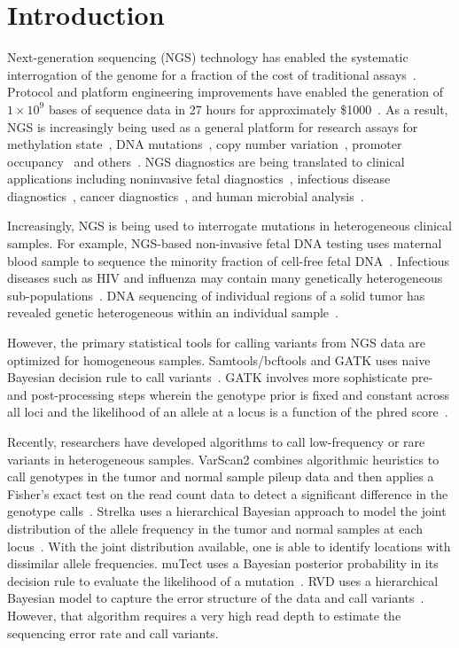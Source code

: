 \documentclass{bioinfo}
\begin{document}
\section{Introduction}

Next-generation sequencing (NGS) technology has enabled the systematic interrogation of the genome for a fraction of the cost of traditional assays~\citep{Koboldt:2013kw}. Protocol and platform engineering improvements have enabled the generation of $1\times10^9$ bases of sequence data in 27 hours for approximately \$1000~\citep{Quail:2012hf}. As a result, NGS is increasingly being used as a general platform for research assays for methylation state~\citep{Laird:2010ab}, DNA mutations~\citep{Consortium:2013co}, copy number variation~\citep{Alkan:2009cr}, promoter occupancy~\citep{Ouyang:2009hc} and others~\citep{Rivera:2013ee}. NGS diagnostics are being translated to clinical applications including noninvasive fetal diagnostics~\citep{Kitzman:2012hea}, infectious disease diagnostics~\citep{Capobianchi:2012em}, cancer diagnostics~\citep{Navin:2010gu}, and human microbial analysis~\citep{Consortium:2013iz}.

Increasingly, NGS is being used to interrogate mutations in heterogeneous clinical samples. For example, NGS-based non-invasive fetal DNA testing uses maternal blood sample to sequence the minority fraction of cell-free fetal DNA~\citep{Fan:2008di}. Infectious diseases such as HIV and influenza may contain many genetically heterogeneous sub-populations~\citep{Flaherty:2011ja, Ghedin:2010ie}. DNA sequencing of individual regions of a solid tumor has revealed genetic heterogeneous within an individual sample~\citep{Navin:2010gu}.

However, the primary statistical tools for calling variants from NGS data are optimized for homogeneous samples.  Samtools/bcftools and GATK uses naive Bayesian decision rule to call variants~\citep{li2011statistical, depristo2011framework}. GATK involves more sophisticate pre- and post-processing steps wherein the genotype prior is fixed and constant across all loci and the likelihood of an allele at a locus is a function of the phred score~\citep{McKenna:2010bv}.

Recently, researchers have developed algorithms to call low-frequency or rare variants in heterogeneous samples.  VarScan2 combines algorithmic heuristics to call genotypes in the tumor and normal sample pileup data and then applies a Fisher's exact test on the read count data to detect a significant difference in the genotype calls~\citep{Koboldt:2012cg}. Strelka uses a hierarchical Bayesian approach to model the joint distribution of the allele frequency in the tumor and normal samples at each locus~\citep{Saunders:2012fh}. With the joint distribution available, one is able to identify locations with dissimilar allele frequencies. muTect uses a Bayesian posterior probability in its decision rule to evaluate the likelihood of a mutation~\citep{Cibulskis:2013ta}. RVD uses a hierarchical Bayesian model to capture the error structure of the data and call variants~\citep{Flaherty:2011ja, cushing2013rvd}. However, that algorithm requires a very high read depth to estimate the sequencing error rate and call variants.
\end{document}
